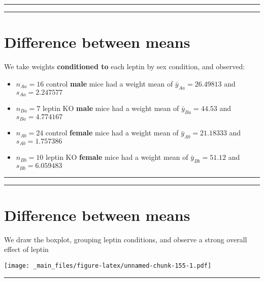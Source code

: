 \documentclass[
]{book}
\begin{document}
\begin{center}\rule{0.5\linewidth}{0.5pt}\end{center}

\begin{center}\rule{0.5\linewidth}{0.5pt}\end{center}

\hypertarget{difference-between-means-10}{%
\section{Difference between means}\label{difference-between-means-10}}

We take weights \textbf{conditioned to} each leptin by sex condition, and observed:

\begin{itemize}
\item
  \(n_{Aa}=16\) control \textbf{male} mice had a weight mean of \(\bar{y}_{Aa}=26.49813\) and \(s_{Aa}=2.247577\)
\item
  \(n_{Ba}=7\) leptin KO \textbf{male} mice had a weight mean of \(\bar{y}_{Ba}=44.53\) and \(s_{Ba}=4.774167\)
\item
  \(n_{Ab}=24\) control \textbf{female} mice had a weight mean of \(\bar{y}_{Ab}=21.18333\) and \(s_{Ab}=1.757386\)
\item
  \(n_{Bb}=10\) leptin KO \textbf{female} mice had a weight mean of \(\bar{y}_{Bb}=51.12\) and \(s_{Bb}=6.059483\)
\end{itemize}

\begin{center}\rule{0.5\linewidth}{0.5pt}\end{center}

\begin{center}\rule{0.5\linewidth}{0.5pt}\end{center}

\hypertarget{difference-between-means-11}{%
\section{Difference between means}\label{difference-between-means-11}}

We draw the boxplot, grouping leptin conditions, and observe a strong overall effect of leptin

\texttt{[image: \_main\_files/figure-latex/unnamed-chunk-155-1.pdf]}

\begin{center}\rule{0.5\linewidth}{0.5pt}\end{center}
\end{document}
